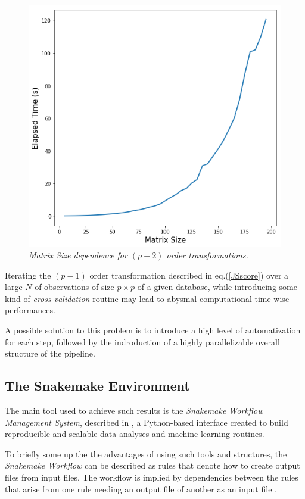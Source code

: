 \documentclass[12pt,openright,twoside,a4paper]{book}
\begin{document}
\begin{figure}[!h]
\centering
\includegraphics[scale=0.42]{RC2-timeVsize}
\caption{\textit{Matrix Size dependence for $(p-2)$ order transformations.}}
\label{timevsize}
\end{figure}

Iterating the $(p-1)$ order transformation described in eq.(\ref{JSscore}) over a large $N$ of observations of size $	p \times p$ of a given database, while introducing some kind of \textit{cross-validation} routine may lead to abysmal computational time-wise performances.

A possible solution to this problem is to introduce a high level of automatization for each step, followed by the indroduction of a highly parallelizable overall structure of the pipeline.

\subsection{The Snakemake Environment}

The main tool used to achieve such results is the \textit{ Snakemake Workflow Management System}, described in \cite{SnakeMake}, a Python-based interface created to build reproducible and scalable data analyses and machine-learning routines.

To briefly some up the the advantages of using such tools and structures, the \textit{Snakemake Workflow} can be described as rules that denote how to create output files from input files. The workflow is implied by dependencies between the rules that arise from one rule needing an output file of another as an input file \cite{SnakeMake}.
\end{document}
